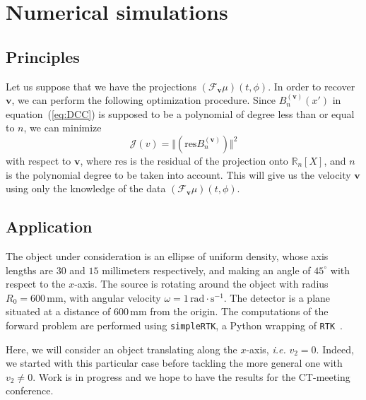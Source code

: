 \documentclass[twocolumn]{IEEEtran}
\newcommand{\R}{\mathbb{R}}
\newcommand{\ie}{\emph{i.e.} }
\newcommand{\bv}{\mathbf{v}}
\newcommand{\Tbv}{\mathcal{F}_{\mathbf{v}}}
\newcommand{\Bnv}{B_n^{(\bv)}}
\begin{document}
\section{Numerical simulations}

\subsection{Principles}
\label{sub:principles}
Let us suppose that we have the projections $\left( \Tbv \mu \right)(t,\phi)$. In order to recover $\bv$, we can perform the following optimization procedure. Since $\Bnv(x')$ in equation~(\ref{eq:DCC}) is supposed to be a polynomial of degree less than or equal to $n$, we can minimize
\begin{equation}
	\mathcal{J}(v) = \Vert \left( \textrm{res} \Bnv \right) \Vert^2
\label{eq:Jv}
\end{equation}
with respect to $\bv$, where $\textrm{res}$ is the residual of the projection onto $\R_n[X]$, and $n$ is the polynomial degree to be taken into account. This will give us the velocity $\bv$ using only the knowledge of the data $\left( \Tbv \mu \right)(t,\phi)$.

\subsection{Application}
\label{sub:application}

The object under consideration is an ellipse of uniform density, whose axis lengths are $30$ and $15$ millimeters respectively, and making an angle of $45^{\circ}$ with respect to the $x$-axis. The source is rotating around the object with radius $R_0 = 600 \, \textrm{mm}$, with angular velocity $\omega = 1 \, \textrm{rad} \cdot \textrm{s}^{-1}$. The detector is a plane situated at a distance of $600 \, \textrm{mm}$ from the origin. The computations of the forward problem are performed using \verb+simpleRTK+, a Python wrapping of \verb+RTK+~\cite{RTK}.

Here, we will consider an object translating along the $x$-axis, \ie $v_2=0$. Indeed, we started with this particular case before tackling the more general one with $v_2 \neq 0$. Work is in progress and we hope to have the results for the CT-meeting conference.
\end{document}
